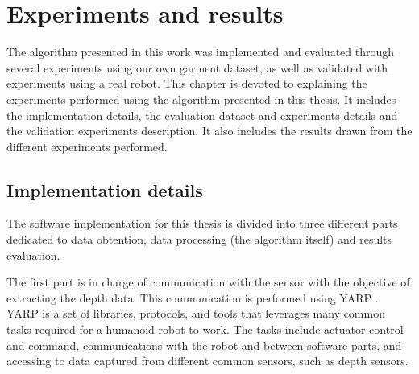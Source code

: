 \chapter{Experiments and results}
\label{experiments_and_results}

The algorithm presented in this work was implemented and evaluated through several experiments using our own garment dataset, as well as validated with experiments using a real robot. This chapter is devoted to explaining the experiments performed using the algorithm presented in this thesis. It includes the implementation details, the evaluation dataset and experiments details and the validation experiments description. It also includes the results drawn from the different experiments performed.

\section{Implementation details}
\label{experiments:implementation}
The software implementation for this thesis is divided into three different parts dedicated to data obtention, data processing (the algorithm itself) and results evaluation. 

The first part is in charge of communication with the sensor with the objective of extracting the depth data. This communication is performed using YARP \cite{metta2006yarp}. YARP is a set of libraries, protocols, and tools that leverages many common tasks required for a humanoid robot to work. The tasks include actuator control and command, communications with the robot and between software parts, and accessing to data captured from different common sensors, such as depth sensors.

